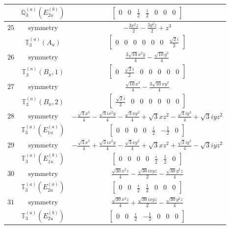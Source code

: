 \documentclass[fleqn,8pt,landscape]{jsarticle}
\begin{document}
\begin{longtable}{ccc}
$  $ & $ \mathbb{Q}_{3}^{(a)}(E_{2u}^{(b)}) $ & $ \begin{bmatrix} 0 & 0 & \frac{1}{2} & \frac{i}{2} & 0 & 0 & 0 \end{bmatrix} $ \\ \hline
$ 25 $ & $ \text{symmetry} $ & $ - \frac{3 x^{2} z}{2} - \frac{3 y^{2} z}{2} + z^{3} $ \\
$  $ & $ \mathbb{T}_{3}^{(a)}(A_{u}) $ & $ \begin{bmatrix} 0 & 0 & 0 & 0 & 0 & 0 & \frac{\sqrt{2} i}{2} \end{bmatrix} $ \\ \hline
$ 26 $ & $ \text{symmetry} $ & $ \frac{3 \sqrt{10} x^{2} y}{4} - \frac{\sqrt{10} y^{3}}{4} $ \\
$  $ & $ \mathbb{T}_{3}^{(a)}(B_{u},1) $ & $ \begin{bmatrix} 0 & \frac{\sqrt{2} i}{2} & 0 & 0 & 0 & 0 & 0 \end{bmatrix} $ \\ \hline
$ 27 $ & $ \text{symmetry} $ & $ \frac{\sqrt{10} x^{3}}{4} - \frac{3 \sqrt{10} x y^{2}}{4} $ \\
$  $ & $ \mathbb{T}_{3}^{(a)}(B_{u},2) $ & $ \begin{bmatrix} \frac{\sqrt{2} i}{2} & 0 & 0 & 0 & 0 & 0 & 0 \end{bmatrix} $ \\ \hline
$ 28 $ & $ \text{symmetry} $ & $ - \frac{\sqrt{3} x^{3}}{4} - \frac{\sqrt{3} i x^{2} y}{4} - \frac{\sqrt{3} x y^{2}}{4} + \sqrt{3} x z^{2} - \frac{\sqrt{3} i y^{3}}{4} + \sqrt{3} i y z^{2} $ \\
$  $ & $ \mathbb{T}_{3}^{(a)}(E_{1u}^{(a)}) $ & $ \begin{bmatrix} 0 & 0 & 0 & 0 & \frac{i}{2} & - \frac{1}{2} & 0 \end{bmatrix} $ \\ \hline
$ 29 $ & $ \text{symmetry} $ & $ - \frac{\sqrt{3} x^{3}}{4} + \frac{\sqrt{3} i x^{2} y}{4} - \frac{\sqrt{3} x y^{2}}{4} + \sqrt{3} x z^{2} + \frac{\sqrt{3} i y^{3}}{4} - \sqrt{3} i y z^{2} $ \\
$  $ & $ \mathbb{T}_{3}^{(a)}(E_{1u}^{(b)}) $ & $ \begin{bmatrix} 0 & 0 & 0 & 0 & \frac{i}{2} & \frac{1}{2} & 0 \end{bmatrix} $ \\ \hline
$ 30 $ & $ \text{symmetry} $ & $ \frac{\sqrt{30} x^{2} z}{4} - \frac{\sqrt{30} i x y z}{2} - \frac{\sqrt{30} y^{2} z}{4} $ \\
$  $ & $ \mathbb{T}_{3}^{(a)}(E_{2u}^{(a)}) $ & $ \begin{bmatrix} 0 & 0 & \frac{i}{2} & \frac{1}{2} & 0 & 0 & 0 \end{bmatrix} $ \\ \hline
$ 31 $ & $ \text{symmetry} $ & $ \frac{\sqrt{30} x^{2} z}{4} + \frac{\sqrt{30} i x y z}{2} - \frac{\sqrt{30} y^{2} z}{4} $ \\
$  $ & $ \mathbb{T}_{3}^{(a)}(E_{2u}^{(b)}) $ & $ \begin{bmatrix} 0 & 0 & \frac{i}{2} & - \frac{1}{2} & 0 & 0 & 0 \end{bmatrix} $ \\ \hline
\end{longtable}
\end{document}
